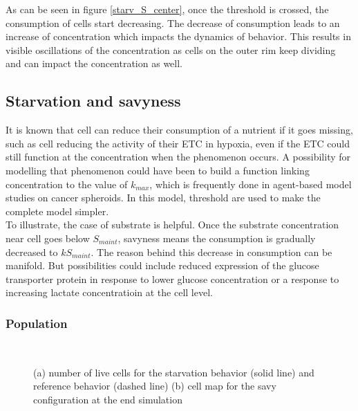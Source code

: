 \documentclass[11pt,a4paper]{article}
\begin{document}
As can be seen in figure \ref{starv_S_center}, once the threshold is crossed, the consumption of cells start decreasing. The decrease of consumption leads to an increase of concentration which impacts the dynamics of behavior. This results in visible oscillations of the concentration as cells on the outer rim keep dividing and can impact the concentration as well.\\


\subsection{Starvation and savyness}
It is known that cell can reduce their consumption of a nutrient if it goes missing, such as cell reducing the activity of their ETC in hypoxia, even if the ETC could still function at the concentration when the phenomenon occurs.\cite{Lee2020} A possibility for modelling that phenomenon could have been to build a function linking concentration to the value of $k_{max}$, which is frequently done in agent-based model studies on cancer spheroids. In this model, threshold are used to make the complete model simpler.\\

To illustrate, the case of substrate is helpful. Once the substrate concentration near cell goes below $S_{maint}$, savyness means the consumption is gradually decreased to $kS_{maint}$. The reason behind this decrease in consumption can be manifold. But possibilities could include reduced expression of the glucose transporter protein in response to lower glucose concentration or a response to increasing lactate concentratioin at the cell level.\\


\subsubsection{Population}
\begin{figure}[ht!]
\begin{subfigure}{0.5\textwidth}
	\centering
	
	\caption{ \label{savy_numbers}}
\end{subfigure}
~~
\begin{subfigure}{0.5\textwidth}
	\centering
	
	\caption{\label{savy_Grid}}
\end{subfigure}
\caption{(a) number of live cells for the starvation behavior (solid line) and reference behavior (dashed line) (b) cell map for the savy configuration at the end simulation \label{savy_numbers_Grid}}
\end{figure}
\end{document}
